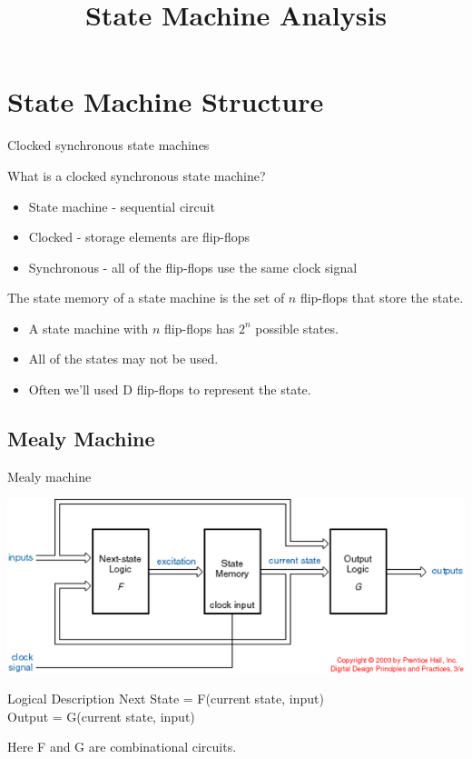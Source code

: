 \title{State Machine Analysis}

\section{State Machine Structure}

\begin{frame}{Clocked synchronous state machines}
  \begin{block}{What is a clocked synchronous state machine?}
    \begin{itemize}
      \item State machine - sequential circuit
      \item Clocked - storage elements are flip-flops
      \item Synchronous - all of the flip-flops use the same clock signal
    \end{itemize}
  \end{block}
  The \alert{state memory} of a state machine is the set of $n$ flip-flops that store the state.
  \begin{itemize}
    \item A state machine with $n$ flip-flops has $2^n$ possible states.
    \item All of the states may not be used.
    \item Often we'll used D flip-flops to represent the state.
  \end{itemize}
\end{frame}

\subsection{Mealy Machine}

\begin{frame}{Mealy machine}
  \begin{center}
    \includegraphics[scale=0.6]{MealyMachine}
  \end{center}
  \begin{block}{Logical Description}
    Next State = F(current state, input)\\
    Output = G(current state, input)
  \end{block}
  Here F and G are combinational circuits.
\end{frame}

